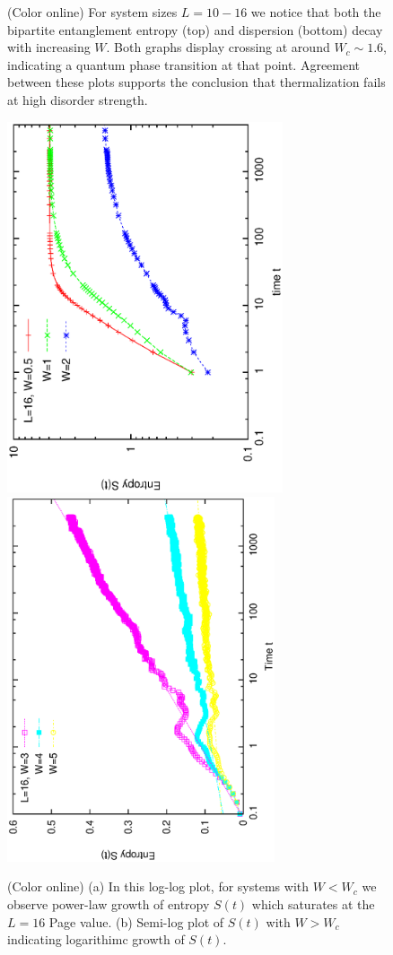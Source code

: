 \documentclass[prl,aps,epsf,showpacs,twocolumn,letterpaper]{revtex4}
\begin{document}
\begin{figure}
{		(Color online) For system sizes $L = 10-16$ we notice that both the bipartite entanglement entropy (top) and dispersion (bottom) decay with increasing $W$.  Both graphs display crossing at around $W_c\sim1.6$, indicating a quantum phase transition at that point.  Agreement between these plots supports the conclusion that thermalization fails at high disorder strength.}
	\label{fig1}
\end{figure}

\begin{figure}[b]
	\includegraphics[angle=-90, origin=c, width=3.2in]{newfig1a.ps}\\
	\vspace{-0.6in}
	\includegraphics[angle=-90,width=3.1in]{newfig1b.ps}\\
	\vspace{0.1in}
	\caption{
		(Color online) (a) In this log-log plot, for systems with $W<W_c$ we observe power-law growth of entropy $S(t)$ which saturates at the $L=16$ Page value. (b) Semi-log plot of $S(t)$ with $W > W_c$ indicating logarithimc growth of $S(t)$.}
	\label{fig2}
\end{figure}
\end{document}

